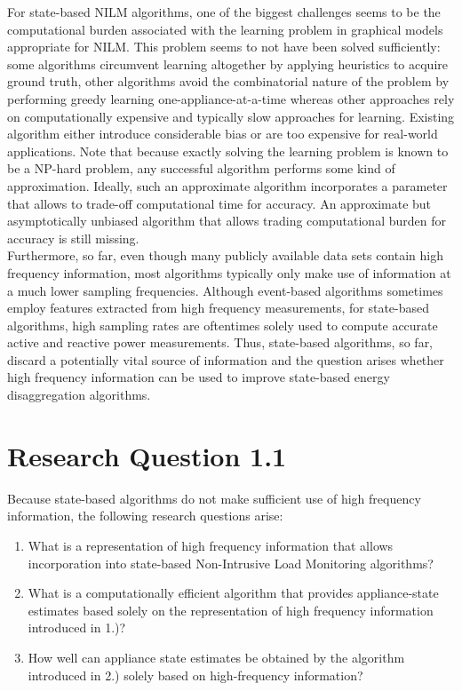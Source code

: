 \documentclass[11pt]{cmuthesis} %
\begin{document}
For state-based NILM algorithms, one of the biggest challenges seems to be the computational burden associated with the learning problem in graphical models appropriate for NILM. This problem seems to not have been solved sufficiently: some algorithms circumvent learning altogether by applying heuristics to acquire ground truth, other algorithms avoid the combinatorial nature of the problem by performing greedy learning one-appliance-at-a-time whereas other approaches rely on computationally expensive and typically slow approaches for learning. Existing algorithm either introduce considerable bias or are too expensive for real-world applications. Note that because exactly solving the learning problem is known to be a NP-hard problem, any successful algorithm performs some kind of approximation. Ideally, such an approximate algorithm incorporates a parameter that allows to trade-off computational time for accuracy. An approximate but asymptotically unbiased algorithm that allows trading computational burden for accuracy is still missing.\\
Furthermore, so far, even though many publicly available data sets contain high frequency information, most algorithms typically only make use of information at a much lower sampling frequencies. Although event-based algorithms sometimes employ features extracted from high frequency measurements, for state-based algorithms, high sampling rates are oftentimes solely used to compute accurate active and reactive power measurements. Thus, state-based algorithms, so far, discard a potentially vital source of information and the question arises whether high frequency information can be used to improve state-based energy disaggregation algorithms.

\newpage
\section{Research Question 1.1}

Because state-based algorithms do not make sufficient use of high frequency information, the following research questions arise:

\begin{enumerate}
\item What is a representation of high frequency information that allows incorporation into state-based Non-Intrusive Load Monitoring algorithms?
\item What is a computationally efficient algorithm that provides appliance-state estimates based solely on the representation of high frequency information introduced in 1.)?
\item How well can appliance state estimates be obtained by the algorithm introduced in 2.) solely based on high-frequency information?
\end{enumerate}
\end{document}
